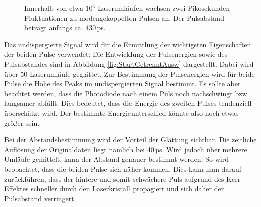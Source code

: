 \documentclass[bachelor,       %
               twoside,        %
               BCOR10mm,       %
               liststotoc,nomtotoc,bibtotoc, %
               english,ngerman, %
               final,          %
               ]{GAUBM}
\begin{document}
\begin{figure}[!htb]
   \centering
   \hfill
   \caption{Innerhalb von etwa $10^4$ Laserumläufen wachsen zwei Pikosekunden-Fluktuationen zu modengekoppelten Pulsen an.
   Der Pulsabstand beträgt anfangs ca. 430\,ps.}
   \label{fig:StartGetrennt}
\end{figure}
Das undispergierte Signal wird für die Ermittlung der wichtigsten Eigenschaften der beiden Pulse  verwendet: Die Entwicklung der Pulsenergien sowie des Pulsabstandes sind in Abbildung \ref{fig:StartGetrenntAusw} dargestellt.
Dabei wird über 50 Laserumläufe geglättet.
Zur Bestimmung der Pulsenergien wird für beide Pulse die Höhe des Peaks im undispergierten Signal bestimmt.
Es sollte aber beachtet werden, dass die Photodiode nach einem Puls noch nachschwingt bzw. langsamer abfällt.
Dies bedeutet, dass die Energie des zweiten Pulses tendenziell überschätzt wird.
Der bestimmte Energieunterschied könnte also noch etwas größer sein.

Bei der Abstandsbestimmung wird der Vorteil der Glättung sichtbar.
Die zeitliche Auflösung der Originaldaten liegt nämlich bei 40\,ps.
Wird jedoch über mehrere Umläufe gemittelt, kann der Abstand genauer bestimmt werden.
So wird beobachtet, dass die beiden Pulse sich näher kommen.
Dies kann man darauf zurückführen, dass der hintere und somit schwächere Puls aufgrund des Kerr-Effektes schneller durch den Laserkristall propagiert und sich daher der Pulsabstand verringert.
\end{document}
